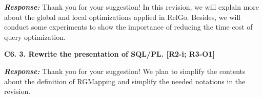 \textbf{\textit{Response: }}
Thank you for your suggestion! In this revision, we will explain more about the global and local optimizations applied in RelGo.
Besides, we will conduct some experiments to show the importance of reducing the time cost of query optimization.


\textbf{
C6. 3. Rewrite the presentation of SQL/PL. [R2-i; R3-O1]
}

\textbf{\textit{Response: }}
Thank you for your suggestion! We plan to simplify the contents about the definition of RGMapping and simplify the needed notations in the revision.

